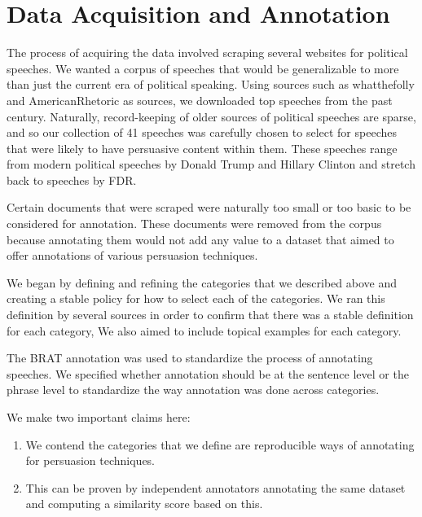 \documentclass[letterpaper]{article}
\begin{document}
\section{Data Acquisition and Annotation}
The process of acquiring the data involved scraping several websites for political speeches. We wanted a corpus of speeches that would be generalizable to more than just the current era of political speaking. Using sources such as whatthefolly and AmericanRhetoric as sources, we downloaded top speeches from the past century. Naturally, record-keeping of older sources of political speeches are sparse, and so our collection of 41 speeches was carefully chosen to select for speeches that were likely to have persuasive content within them. These speeches range from modern political speeches by Donald Trump and Hillary Clinton and stretch back to speeches by FDR. 

Certain documents that were scraped were naturally too small or too basic to be considered for annotation. These documents were removed from the corpus because annotating them would not add any value to a dataset that aimed to offer annotations of various persuasion techniques.

We began by defining and refining the categories that we described above and creating a stable policy for how to select each of the categories. We ran this definition by several sources in order to confirm that there was a stable definition for each category, We also aimed to include topical examples for each category. 

The BRAT annotation was used to standardize the process of annotating speeches. We specified whether annotation should be at the sentence level or the phrase level to standardize the way annotation was done across categories.

We make two important claims here: 
	\begin{enumerate}
		\item We contend the categories that we define are reproducible ways of annotating for persuasion techniques.
		\item This can be proven by independent annotators annotating the same dataset and computing a similarity score based on this.
	\end{enumerate}
\end{document}

